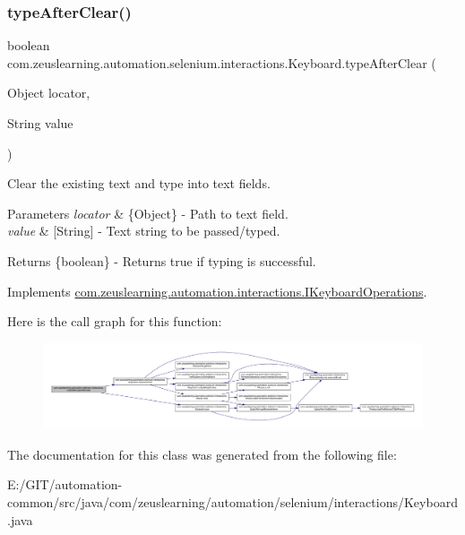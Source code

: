 \subsubsection{\texorpdfstring{type\+After\+Clear()}{typeAfterClear()}}
{\footnotesize\ttfamily boolean com.\+zeuslearning.\+automation.\+selenium.\+interactions.\+Keyboard.\+type\+After\+Clear (\begin{DoxyParamCaption}\item[{Object}]{locator,  }\item[{String}]{value }\end{DoxyParamCaption})\hspace{0.3cm}{\ttfamily [inline]}}

Clear the existing text and type into text fields.


\begin{DoxyParams}{Parameters}
{\em locator} & \{Object\} -\/ Path to text field. \\
\hline
{\em value} & \mbox{[}String\mbox{]} -\/ Text string to be passed/typed.\\
\hline
\end{DoxyParams}
\begin{DoxyReturn}{Returns}
\{boolean\} -\/ Returns {\ttfamily true} if typing is successful. 
\end{DoxyReturn}


Implements \hyperlink{interfacecom_1_1zeuslearning_1_1automation_1_1interactions_1_1IKeyboardOperations_a81c4fed89a3f9c822db19bad8a948f6b}{com.\+zeuslearning.\+automation.\+interactions.\+I\+Keyboard\+Operations}.

Here is the call graph for this function\+:
\nopagebreak
\begin{figure}[H]
\begin{center}
\leavevmode
\includegraphics[width=350pt]{d1/d26/classcom_1_1zeuslearning_1_1automation_1_1selenium_1_1interactions_1_1Keyboard_a2436faf2f5954d8e1d4cb326c7bb8e06_cgraph}
\end{center}
\end{figure}


The documentation for this class was generated from the following file\+:\begin{DoxyCompactItemize}
\item 
E\+:/\+G\+I\+T/automation-\/common/src/java/com/zeuslearning/automation/selenium/interactions/Keyboard.\+java\end{DoxyCompactItemize}
